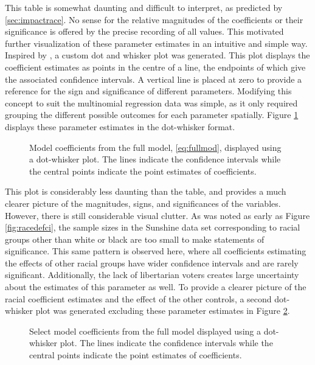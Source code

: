 This table is somewhat daunting and difficult to interpret, as predicted by \ref{sec:impactrace}. No sense for the relative
magnitudes of the coefficients or their significance is offered by the precise recording of all values. This motivated further
visualization of these parameter estimates in an intuitive and simple way. Inspired by \cite{dotwhisker}, a custom dot and
whisker plot was generated. This plot displays the coefficient estimates as points in the centre of a line, the endpoints of which
give the associated confidence intervals. A vertical line is placed at zero to provide a reference for the sign and significance
of different parameters. Modifying this concept to suit the multinomial regression data was simple, as it only required grouping
the different possible outcomes for each parameter spatially. Figure \ref{fig:modallcoef} displays these parameter estimates in
the dot-whisker format.

\begin{figure}[h!]
  \centering
  \caption[All Model Coefficients]{\footnotesize Model coefficients from the full model, \ref{eq:fullmod}, displayed using
    a dot-whisker plot. The lines indicate the confidence intervals while the central points indicate the point estimates of
    coefficients.}
  \label{fig:modallcoef}
\end{figure}

This plot is considerably less daunting than the table, and provides a much clearer picture of the magnitudes, signs, and
significances of the variables. However, there is still considerable visual clutter. As was noted as early as Figure
\ref{fig:racedefci}, the sample sizes in the Sunshine data set corresponding to racial groups other than white or black are too
small to make statements of significance. This same pattern is observed here, where all coefficients estimating the effects of
other racial groups have wider confidence intervals and are rarely significant. Additionally, the lack of libertarian voters
creates large uncertainty about the estimates of this parameter as well. To provide a clearer picture of the racial coefficient
estimates and the effect of the other controls, a second dot-whisker plot was generated excluding these parameter estimates in
Figure \ref{fig:modselcoef}.

\begin{figure}[h!]
  \centering
  \caption[Select Model Coefficients]{\footnotesize Select model coefficients from the full model displayed using a dot-whisker
    plot. The lines indicate the confidence intervals while the central points indicate the point estimates of coefficients.}
  \label{fig:modselcoef}
\end{figure}

